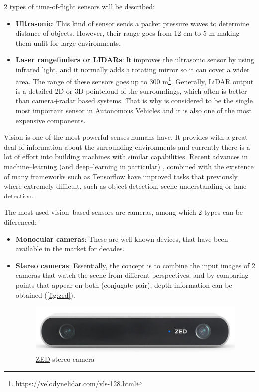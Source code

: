 2 types of time-of-flight sensors will be described:
\begin{itemize}
  \item \textbf{Ultrasonic}: This kind of sensor sends a packet pressure waves to determine distance of objects. However, their range goes from 12 cm to 5 m making them unfit for large environments.

  \item \textbf{Laser rangefinders or LIDARs}: It improves the ultrasonic sensor by using infrared light, and it normally adds a rotating mirror so it can cover a wider area. The range of these sensors goes up to 300 m\footnote{https://velodynelidar.com/vls-128.html}. Generally, LiDAR output is a detailed 2D or 3D pointcloud of the surroundings, which often is better than camera+radar based systems. That is why is considered to be the single most important sensor in Autonomous Vehicles  and it is also one of the most expensive components.
\end{itemize}  

 Vision is one of the most powerful senses humans have. It provides with a great deal of information about the surrounding environments and currently there is a lot of effort into building machines with similar capabilities. Recent advances in machine--learning (and deep--learning in particular) , combined with the existence of many frameworks such as \href{https://www.tensorflow.org/}{Tensorflow} have improved tasks that previously where extremely difficult, such as object detection, scene understanding or lane detection.

The most used vision--based sensors are cameras, among which 2 types can be diferenced:

\begin{itemize}
  \item \textbf{Monocular cameras}: These are well known devices, that have been available in the market for decades.

  \item \textbf{Stereo cameras}: Essentially, the concept is to combine the input images of 2 cameras that watch the scene from different perspectives, and by comparing points that appear on both (conjugate pair), depth information can be obtained (\autoref{fig:zed}).
  \begin{figure}[htb]
    \centering
    \includegraphics[width=.8\linewidth]{pictures/02/zed}
    \caption{\href{https://www.stereolabs.com/}{ZED} stereo camera}
    \label{fig:zed}
  \end{figure} 
\end{itemize}  

